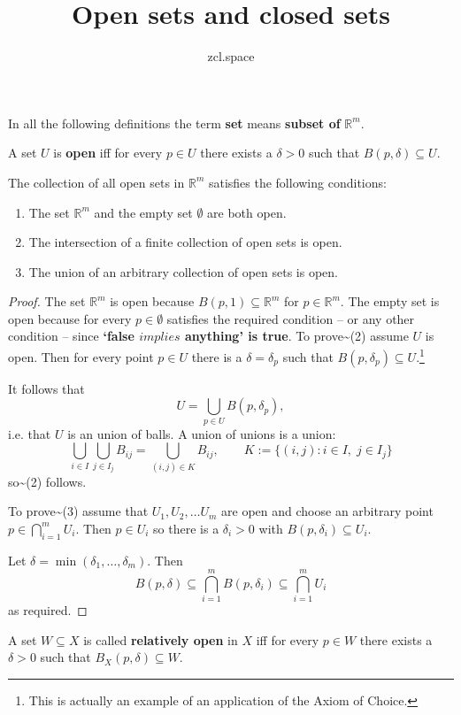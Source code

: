 \documentclass[10pt,a4paper,UTF8]{article}
\author{zcl.space}
\date{}
\title{Open sets and closed sets}
\begin{document}
\maketitle
\tableofcontents
In all the following definitions the term \textbf{set} means \textbf{subset of} \(\mathbb{R}^m\).

\begin{definition}
A set  \(U\) is \textbf{open} iff for every \(p\in U\)
there exists a \(\delta > 0\) such that \(B(p,\delta)\subseteq U\).
\end{definition}


\begin{tikztheorem}
The collection of all open sets in \(\mathbb{R}^m\) satisfies the following conditions:
\begin{enumerate}
\item The  set  \(\mathbb{R}^m\) and the empty set \(\emptyset\) are both open.
\item The intersection of a finite collection of open sets is open.
\item The union of an arbitrary collection of open sets is open.
\end{enumerate}
\end{tikztheorem}
\begin{proof}
 The set \(\mathbb{R}^m\) is open because \(B(p,1)\subseteq\mathbb{R}^m\) for \(p\in\mathbb{R}^m\).
The empty set is open because for every \(p\in\emptyset\)
satisfies the required condition -- or any other condition --  since
\textbf{`false \(implies\) anything' is true}.
To prove\textasciitilde{}(2) assume \(U\) is open.  Then for  every point \(p\in U\) there is a \(\delta=\delta_p\)
such that \(B(p,\delta_p)\subseteq U\).\footnote{This is actually an example of an application of the Axiom of Choice.}

It follows that
$$
       U=\bigcup_{p\in U} B(p,\delta_p),
$$
i.e. that \(U\) is an union of balls. A union of unions is a union:
$$
     \bigcup_{i\in I}\bigcup_{j\in I_j} B_{ij}=\bigcup_{(i,j)\in K} B_{ij},
     \qquad
     K:=\{(i,j): i\in I,\; j\in I_j\}
$$
so\textasciitilde{}(2) follows.

To prove\textasciitilde{}(3) assume that \(U_1,U_2,\ldots U_m\) are open and choose an arbitrary point \(p\in\bigcap_{i=1}^m U_i\). Then \(p\in U_i\) so there is a \(\delta_i > 0\) with \(B(p,\delta_i)\subseteq U_i\).

Let \(\delta=\min(\delta_1,\ldots,\delta_m)\). Then
$$
   B(p,\delta)\subseteq \bigcap_{i=1}^m B(p,\delta_i)\subseteq \bigcap_{i=1}^m U_i
$$
as required.
\end{proof}
\begin{definition}
A set \(W\subseteq X\) is called \textbf{relatively open} in \(X\) iff for every \(p\in W\) there exists a \(\delta > 0\) such that \(B_X(p,\delta)\subseteq W\).
\end{definition}
\end{document}
